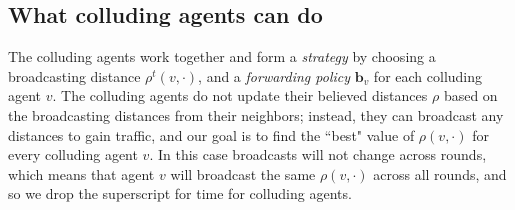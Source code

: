 \documentclass{comnet}
\begin{document}
%
%
%
%
%

\subsection{What colluding agents can do}
\label{sec:uniform-nonuniform-models}

The colluding agents work together and form a \emph{strategy} by choosing a broadcasting distance $\rho^t(v,\cdot)$,  and a {\it forwarding policy} $\mathbf{b}_{v}$ for each colluding agent $v$. The colluding agents do not update their believed distances $\rho$ based on the broadcasting distances from their neighbors; instead, they can broadcast any distances to gain traffic, and our goal is to find the ``best" value of $\rho(v,\cdot)$ for every colluding agent $v$. In this case broadcasts will not change across rounds, which means that agent $v$ will broadcast the same $\rho(v,\cdot)$  across all rounds, and so we drop the superscript for time for colluding agents.  
\end{document}
